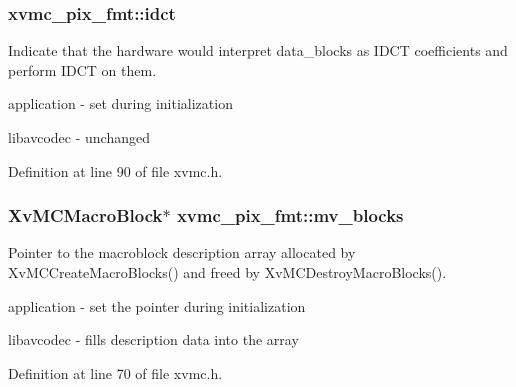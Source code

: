 \subsubsection[{\texorpdfstring{idct}{idct}}]{ xvmc\+\_\+pix\+\_\+fmt\+::idct}\hypertarget{structxvmc__pix__fmt_ac4b1077dca08f6e076840a8797b23d1c}{}\label{structxvmc__pix__fmt_ac4b1077dca08f6e076840a8797b23d1c}
Indicate that the hardware would interpret data\+\_\+blocks as I\+D\+CT coefficients and perform I\+D\+CT on them.
\begin{DoxyItemize}
\item application -\/ set during initialization
\item libavcodec -\/ unchanged 
\end{DoxyItemize}

Definition at line 90 of file xvmc.\+h.

\subsubsection[{\texorpdfstring{mv\+\_\+blocks}{mv_blocks}}]{\setlength{\rightskip}{0pt plus 5cm}Xv\+M\+C\+Macro\+Block$\ast$ xvmc\+\_\+pix\+\_\+fmt\+::mv\+\_\+blocks}\hypertarget{structxvmc__pix__fmt_ad83c1ceb45842ea0d4988f4b9b9e6483}{}\label{structxvmc__pix__fmt_ad83c1ceb45842ea0d4988f4b9b9e6483}
Pointer to the macroblock description array allocated by Xv\+M\+C\+Create\+Macro\+Blocks() and freed by Xv\+M\+C\+Destroy\+Macro\+Blocks().
\begin{DoxyItemize}
\item application -\/ set the pointer during initialization
\item libavcodec -\/ fills description data into the array 
\end{DoxyItemize}

Definition at line 70 of file xvmc.\+h.


